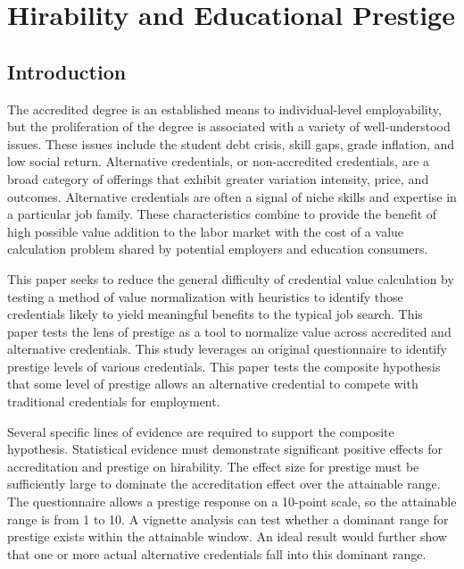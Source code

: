 
\chapter[Hirability and Educational Prestige]{\large Hirability and Educational Prestige}

\section{Introduction}

The accredited degree is an established means to individual-level employability, but the proliferation of the degree is associated with a variety of well-understood issues.
These issues include the student debt crisis, skill gaps, grade inflation, and low social return.
Alternative credentials, or non-accredited credentials, are a broad category of offerings that exhibit greater variation intensity, price, and outcomes\cite{urdan_2020}.
Alternative credentials are often a signal of niche skills and expertise in a particular job family.
These characteristics combine to provide the benefit of high possible value addition to the labor market
with the cost of a value calculation problem shared by potential employers and education consumers.

This paper seeks to reduce the general difficulty of credential value calculation by testing a method of value normalization
with heuristics to identify those credentials likely to yield meaningful benefits to the typical job search.
This paper tests the lens of prestige as a tool to normalize value across accredited and alternative credentials.
This study leverages an original questionnaire to identify prestige levels of various credentials.
This paper tests the composite hypothesis that some level of prestige allows an alternative credential to compete with traditional credentials for employment.

Several specific lines of evidence are required to support the composite hypothesis.
Statistical evidence must demonstrate significant positive effects for accreditation and prestige on hirability.
The effect size for prestige must be sufficiently large to dominate the accreditation effect over the attainable range.
The questionnaire allows a prestige response on a 10-point scale, so the attainable range is from 1 to 10.
A vignette analysis can test whether a dominant range for prestige exists within the attainable window.
An ideal result would further show that one or more actual alternative credentials fall into this dominant range.


